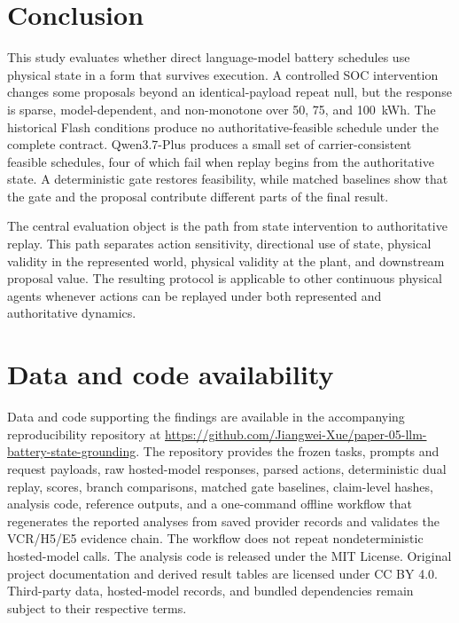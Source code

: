 \documentclass[11pt]{article}
\begin{document}
\section{Conclusion}
\label{sec:conclusion}

This study evaluates whether direct language-model battery schedules use physical state in a form
that survives execution. A controlled SOC intervention changes some proposals beyond an
identical-payload repeat null, but the response is sparse, model-dependent, and non-monotone over
50, 75, and 100~kWh. The historical Flash conditions produce no authoritative-feasible schedule
under the complete contract. Qwen3.7-Plus produces a small set of carrier-consistent feasible
schedules, four of which fail when replay begins from the authoritative state. A deterministic
gate restores feasibility, while matched baselines show that the gate and the proposal contribute
different parts of the final result.

The central evaluation object is the path from state intervention to authoritative replay. This
path separates action sensitivity, directional use of state, physical validity in the represented
world, physical validity at the plant, and downstream proposal value. The resulting protocol is
applicable to other continuous physical agents whenever actions can be replayed under both
represented and authoritative dynamics.

\section*{Data and code availability}

Data and code supporting the findings are available in the accompanying reproducibility
repository at
\url{https://github.com/Jiangwei-Xue/paper-05-llm-battery-state-grounding}.
The repository provides the frozen tasks, prompts and request payloads, raw hosted-model
responses, parsed actions, deterministic dual replay, scores, branch comparisons, matched gate
baselines, claim-level hashes, analysis code, reference outputs, and a one-command offline
workflow that regenerates the reported analyses from saved provider records and validates the
VCR/H5/E5 evidence chain. The workflow does not repeat nondeterministic hosted-model calls.
The analysis code is released under the MIT License. Original project documentation and derived
result tables are licensed under CC BY 4.0. Third-party data, hosted-model records, and bundled
dependencies remain subject to their respective terms.
\end{document}
